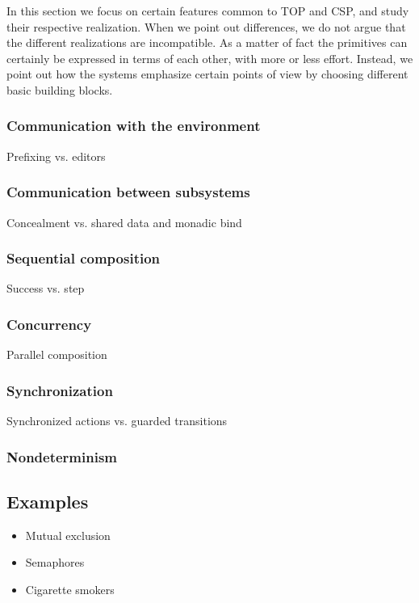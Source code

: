 In this section we focus on certain features common to TOP and CSP, and study their respective realization.
When we point out differences, we do not argue that the different realizations are incompatible.
As a matter of fact the primitives can certainly be expressed in terms of each other, with more or less effort.
Instead, we point out how the systems emphasize certain points of view by choosing different basic building blocks.

\subsubsection*{Communication with the environment}
Prefixing vs. editors

\subsubsection*{Communication between subsystems}
Concealment vs. shared data and monadic bind

\subsubsection*{Sequential composition}
Success vs. step

\subsubsection*{Concurrency}
Parallel composition

\subsubsection*{Synchronization}
Synchronized actions vs. guarded transitions

\subsubsection*{Nondeterminism}


\subsection{Examples}

\begin{itemize}
\item Mutual exclusion
\item Semaphores
\item Cigarette smokers
\end{itemize}
